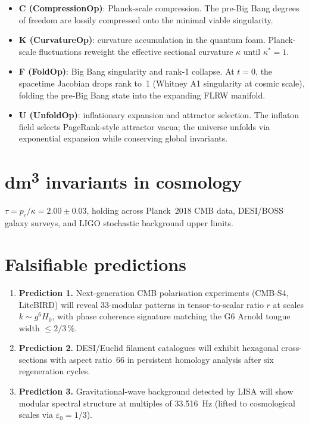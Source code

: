 \begin{itemize}
\item \textbf{C (CompressionOp)}: Planck-scale compression. The pre-Big Bang degrees of freedom are lossily compressed onto the minimal viable singularity.
\item \textbf{K (CurvatureOp)}: curvature accumulation in the quantum foam. Planck-scale fluctuations reweight the effective sectional curvature \(\kappa\) until \(\kappa^* = 1\).
\item \textbf{F (FoldOp)}: Big Bang singularity and rank-1 collapse. At \(t = 0\), the spacetime Jacobian drops rank to~1 (Whitney A1 singularity at cosmic scale), folding the pre-Big Bang state into the expanding FLRW manifold.
\item \textbf{U (UnfoldOp)}: inflationary expansion and attractor selection. The inflaton field selects PageRank-style attractor vacua; the universe unfolds via exponential expansion while conserving global invariants.
\end{itemize}

\section{dm\textsuperscript{3} invariants in cosmology}

$\tau = p_c / \kappa = 2.00 \pm 0.03$, holding across Planck~2018 CMB data, DESI/BOSS galaxy surveys, and LIGO stochastic background upper limits.

\section{Falsifiable predictions}

\begin{enumerate}
\item \textbf{Prediction 1.} %
Next-generation CMB polarisation experiments (CMB-S4, LiteBIRD) will reveal 33-modular patterns in tensor-to-scalar ratio $r$ at scales $k \sim g^6 H_0$, with phase coherence signature matching the G6 Arnold tongue width $\le 2/3\,\%$.
\item \textbf{Prediction 2.} DESI/Euclid filament catalogues will exhibit hexagonal cross-sections with aspect ratio~66 in persistent homology analysis after six regeneration cycles.
\item \textbf{Prediction 3.} Gravitational-wave background detected by LISA will show modular spectral structure at multiples of 33.516~Hz (lifted to cosmological scales via \(\varepsilon_0 = 1/3\)).
\end{enumerate}

